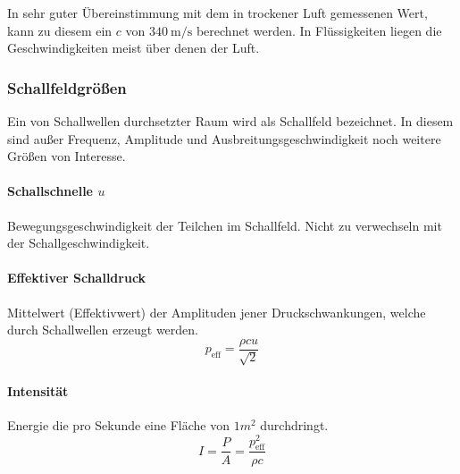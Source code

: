 In sehr guter Übereinstimmung mit dem in trockener Luft gemessenen Wert, kann zu diesem ein $c$ von $\si{340~\metre\per\second}$ berechnet werden. In Flüssigkeiten liegen die Geschwindigkeiten meist über denen der Luft.

\subsubsection{Schallfeldgrößen}
Ein von Schallwellen durchsetzter Raum wird als Schallfeld bezeichnet. In diesem sind außer Frequenz, Amplitude und Ausbreitungsgeschwindigkeit noch weitere Größen von Interesse.

\paragraph{Schallschnelle $u$}
Bewegungsgeschwindigkeit der Teilchen im Schallfeld. Nicht zu verwechseln mit der Schallgeschwindigkeit.

\paragraph{Effektiver Schalldruck}
Mittelwert (Effektivwert) der Amplituden jener Druckschwankungen, welche durch Schallwellen erzeugt werden.
$$p_\text{eff} = \frac{\rho c u}{\sqrt{2}}$$
\begin{vardef}
\end{vardef}

\paragraph{Intensität}
Energie die pro Sekunde eine Fläche von $1 m^2$ durchdringt.
$$I = \frac{P}{A} = \frac{p_\text{eff}^2}{\rho c}$$
\begin{vardef}
\end{vardef}


